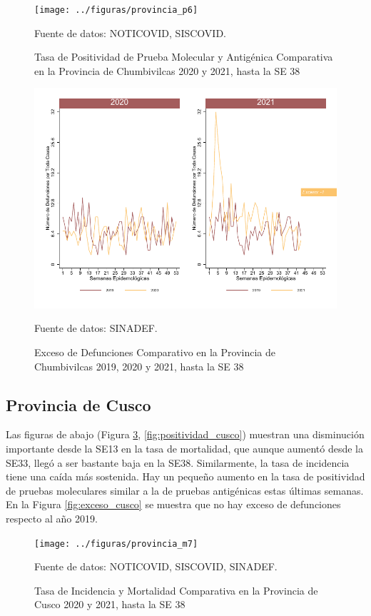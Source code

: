 \documentclass[12pt,a4paper,openany]{book}
\begin{document}
	\begin{figure}[h]
	\caption{Tasa de Positividad de Prueba Molecular y Antigénica Comparativa en la Provincia de Chumbivilcas 2020 y 2021, hasta la SE 38}\label{fig:positividad_chumbivilcas}
	\begin{center}
		\texttt{[image: ../figuras/provincia\_p6]}
	\end{center}
	{\footnotesize {Fuente de datos: NOTICOVID, SISCOVID.}}
	\end{figure}

	\begin{figure}[h]
	\caption{Exceso de Defunciones Comparativo en la Provincia de Chumbivilcas 2019, 2020 y 2021, hasta la SE 38}\label{fig:exceso_chumbivilcas}
	\begin{center}
		\includegraphics[width=0.7\linewidth]{../figuras/exceso_6}
	\end{center}
	{\footnotesize {Fuente de datos: SINADEF.}}
	\end{figure}

\clearpage

	\subsection*{Provincia de Cusco}
	\noindent Las figuras de abajo (Figura \ref{fig:inc_mort_cusco}, \ref{fig:positividad_cusco})  muestran una disminución importante desde la SE13 en la tasa de mortalidad, que aunque aumentó desde la SE33, llegó a ser bastante baja en la SE38. Similarmente, la tasa de incidencia tiene una caída más sostenida. Hay un pequeño aumento en la tasa de positividad de pruebas moleculares similar a la de pruebas antigénicas estas últimas semanas. En la Figura \ref{fig:exceso_cusco} se muestra que no hay exceso de defunciones respecto al año 2019.

	\begin{figure}[h]
	\caption{Tasa de Incidencia y Mortalidad Comparativa en la Provincia de Cusco 2020 y 2021, hasta la SE 38}\label{fig:inc_mort_cusco}
	\begin{center}
		\texttt{[image: ../figuras/provincia\_m7]}
	\end{center}
	{\footnotesize {Fuente de datos: NOTICOVID, SISCOVID, SINADEF.}}
	\end{figure}
\end{document}
